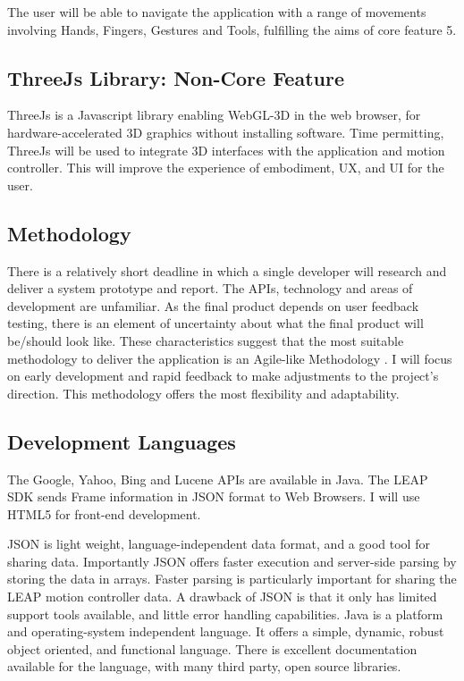 \documentclass[a4paper, 10pt]{article}
\begin{document}
The user will be able to navigate the application with a range of movements involving Hands, Fingers, Gestures and Tools, fulfilling the aims of core feature 5.

\subsection{ThreeJs Library: Non-Core Feature}
ThreeJs is a Javascript library enabling WebGL-3D in the web browser, for hardware-accelerated 3D graphics without installing software. Time permitting, ThreeJs will be used to integrate 3D interfaces with the application and motion controller. This will improve the experience of embodiment, UX, and UI for the user.

\subsection{Methodology}
There is a relatively short deadline in which a single developer will research and deliver a system prototype and report. The APIs, technology and areas of development are unfamiliar. As the final product depends on user feedback testing, there is an element of uncertainty about what the final product will be/should look like. These characteristics suggest that the most suitable methodology to deliver the application is an Agile-like Methodology \cite{agile}. I will focus on early development and rapid feedback to make adjustments to the project's direction. This methodology offers the most flexibility and adaptability.


\subsection{Development Languages}
The Google, Yahoo, Bing and Lucene APIs are available in Java. The LEAP SDK sends Frame information in JSON format to Web Browsers. I will use HTML5 for front-end development.

JSON is light weight, language-independent data format, and a good tool for sharing data. Importantly JSON offers faster execution and server-side parsing by storing the data in arrays. Faster parsing is particularly important for sharing the LEAP motion controller data. A drawback of JSON is that it only has limited support tools available, and little error handling capabilities. Java is a platform and operating-system independent language. It offers a simple, dynamic, robust object oriented, and functional language. There is excellent documentation available for the language, with many third party, open source libraries.
\end{document}
